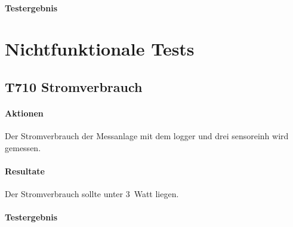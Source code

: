 \paragraph{Testergebnis} 

\section{Nichtfunktionale Tests}
\subsection{T710 Stromverbrauch}
\paragraph{Aktionen} Der Stromverbrauch der Messanlage mit dem \gls{logger} und drei \gls{sensoreinh} wird gemessen. 

\paragraph{Resultate} Der Stromverbrauch sollte unter 3~Watt liegen.

\paragraph{Testergebnis} 